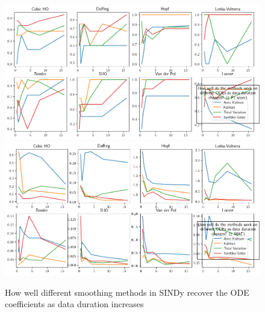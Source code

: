 \documentclass{article}
\begin{document}
\begin{figure}
    \label{fig:time}
    \includegraphics[width=\textwidth]{images/summary_f1_time.png}
    \includegraphics[width=\textwidth]{images/summary_mae_time.png}
    \caption{How well different smoothing methods in SINDy recover the ODE coefficients as data duration increases}
\end{figure}
\end{document}
